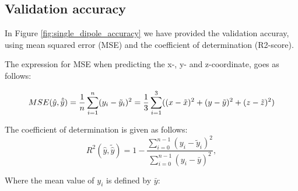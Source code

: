 \documentclass[a4paper, UKenglish, 11pt]{uiomaster}
\begin{document}
%

\subsection{Validation accuracy}
In Figure \ref{fig:single_dipole_accuracy} we have provided the validation accuray, using mean squared error (MSE) and the coefficient of determination (R2-score).

The expression for MSE when predicting the x-, y- and z-coordinate, goes as follows:

\begin{equation}
MSE(\hat{y},\hat{\tilde{y}}) = \frac{1}{n}
\sum_{i=1}^{n}(y_i-\tilde{y}_i)^2 \\
= \frac{1}{3}\sum_{i=1}^{3}((x-\tilde{x})^2 + (y-\tilde{y})^2 + (z-\tilde{z})^2 )
\label{eq:MSE}
\end{equation}

The coefficient of determination is given as follows:
\begin{equation}
R^2(\hat{y}, \tilde{\hat{y}}) = 1 - \frac{\sum_{i=0}^{n - 1} (y_i - \tilde{y}_i)^2}{\sum_{i=0}^{n - 1} (y_i - \bar{y})^2},
\label{eq:R2}
\end{equation}

Where the mean value of $y_i$ is defined by $\bar{y}$:
\end{document}
